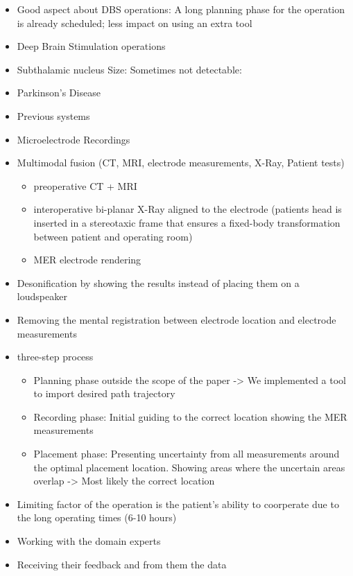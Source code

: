 \begin{itemize}
\item Good aspect about DBS operations: A long planning phase for the operation is already scheduled; less impact on using an extra tool
\item Deep Brain Stimulation operations  \cite{Benabid2009} \cite{Lindberg2002}
\item Subthalamic nucleus Size: \cite{Richter2004} Sometimes not detectable: \cite{Starr2002}
\item Parkinson's Disease
\item Previous systems
\item Microelectrode Recordings \cite{Lenz1988}
\item Multimodal fusion (CT, MRI, electrode measurements, X-Ray, Patient tests)
\begin{itemize}
    \item preoperative CT + MRI
    \item interoperative bi-planar X-Ray aligned to the electrode (patients head is inserted in a stereotaxic frame that ensures a fixed-body transformation between patient and operating room)
    \item MER electrode rendering
\end{itemize}
\item Desonification by showing the results instead of placing them on a loudspeaker
\item Removing the mental registration between electrode location and electrode measurements
\item three-step process
\begin{itemize}
    \item Planning phase outside the scope of the paper -> We implemented a tool to import desired path trajectory \cite{Shamir2010}
    \item Recording phase: Initial guiding to the correct location showing the MER measurements
    \item Placement phase: Presenting uncertainty from all measurements around the optimal placement location. Showing areas where the uncertain areas overlap -> Most likely the correct location
\end{itemize}
\item Limiting factor of the operation is the patient's ability to coorperate due to the long operating times (6-10 hours)
\item Working with the domain experts
\item Receiving their feedback and from them the data

\end{itemize}
